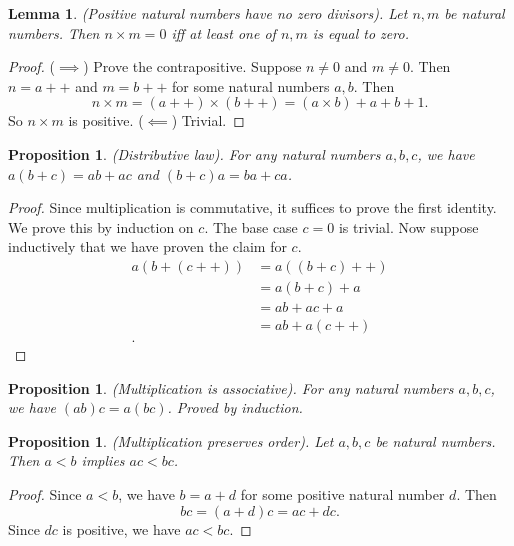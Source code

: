 \documentclass[12pt]{article}
\newtheorem{lemma}[theorem]{Lemma}
\newtheorem{proposition}[theorem]{Proposition}
\theoremstyle{definition}
\theoremstyle{remark}
\begin{document}
\begin{lemma}
    (Positive natural numbers have no zero divisors). Let $n, m$ be natural numbers. Then $n \times m = 0$ iff at least one of $n,m$ is equal to zero.
\end{lemma}

\begin{proof}
    ($\implies$) Prove the contrapositive. Suppose $n \neq 0$ and $m \neq 0$. Then $n = a++$ and $m = b++$ for some natural numbers $a,b$. Then \[
        n \times m = (a++) \times (b++) = (a \times b) + a + b + 1
    .\]
    So $n \times m$ is positive. ($\impliedby$) Trivial.
\end{proof}

\begin{proposition}
    (Distributive law). For any natural numbers $a,b,c$, we have $a(b +c) = ab + ac$ and $(b + c)a = ba + ca$.
\end{proposition}

\begin{proof}
    Since multiplication is commutative, it suffices to prove the first identity. We prove this by induction on $c$. The base case $c = 0$ is trivial. Now suppose inductively that we have proven the claim for $c$.
    \begin{align*}
        a(b + (c++)) &= a((b +c)++) \\
        &= a(b+c) + a \\
        &= ab + ac + a \\
        &= ab + a(c++) \\
    .\end{align*}
\end{proof}

\begin{proposition}
    (Multiplication is associative). For any natural numbers $a,b,c$, we have $(ab)c = a(bc)$. Proved by induction.
\end{proposition}

\begin{proposition}
    (Multiplication preserves order). Let $a,b,c$ be natural numbers. Then $a < b$ implies $ac < bc$.
\end{proposition}

\begin{proof}
    Since $a < b$, we have $b = a + d$ for some positive natural number $d$. Then \[
        bc = (a + d)c = ac + dc
    .\]
    Since $dc$ is positive, we have $ac < bc$.
\end{proof}
\end{document}

